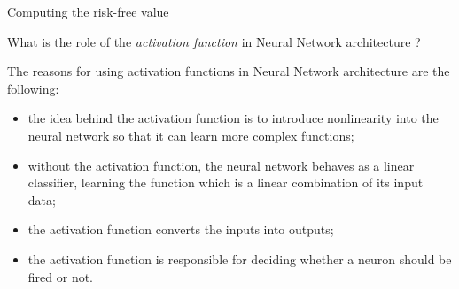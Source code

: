 \documentclass[12pt,a4paper]{exam}
\begin{document}
\begin{questions}
\begin{solution}
Computing the risk-free value 
\end{solution}

\question
What is the role of the \emph{activation function} in Neural Network architecture ?
\fillwithlines{3cm}
\begin{solution}
The reasons for using activation functions in Neural Network architecture are the following:
\begin{itemize}
\item the idea behind the activation function is to introduce nonlinearity into the neural network so that it can learn more complex functions;
\item without the activation function, the neural network behaves as a linear classifier, learning the function which is a linear combination of its input data;
\item the activation function converts the inputs into outputs;
\item the activation function is responsible for deciding whether a neuron should be fired or not.
\end{itemize}
\end{solution}

\end{questions}
\end{document}
